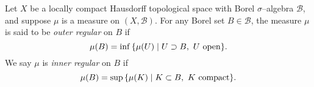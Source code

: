 \documentclass[12pt]{article}
\begin{document}
Let $X$ be a locally compact Hausdorff topological space with Borel $\sigma$--algebra $\mathcal{B}$, and suppose $\mu$ is a measure on $(X,\mathcal{B})$. For any Borel set $B \in \mathcal{B}$, the measure $\mu$ is said to be {\em outer regular} on $B$ if
$$
\mu(B) = \inf\,\{ \mu(U) \mid U \supset B,\ U\ \rm{open} \}.
$$
We say $\mu$ is {\em inner regular} on $B$ if
$$
\mu(B) = \sup\,\{ \mu(K) \mid K \subset B,\ K\ \rm{compact} \}.
$$
\end{document}
